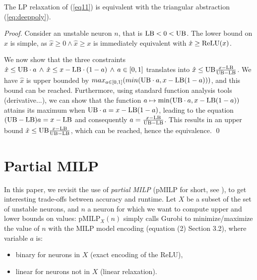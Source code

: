 



\begin{proposition}
	\cite{alessandro}
	\label{LP}
	The LP relaxation of (\ref{eq11}) is equivalent with the triangular abstraction 	(\ref{eq:deeppoly}).
\end{proposition}
 




\begin{proof}
	Consider an unstable neuron $n$, that is $\mathrm{LB} < 0 < \mathrm{UB}$.
The lower bound on $\hat{x}$ is simple, as $\hat{x} \geq 0 \wedge \hat{x} \geq x$ is immediately equivalent with $\hat{x} \geq \mathrm{ReLU}(x)$.

We now show that the three constraints 
$\hat{x} \leq \mathrm{UB} \cdot a \, \wedge \, \hat{x} \leq x-\mathrm{LB} \cdot (1-a) \, \wedge \, a \in [0,1]$ translates into $\hat{x} \leq \mathrm{UB} \frac{x-\mathrm{LB}}{\mathrm{UB}-\mathrm{LB}}$. 
We have $\hat{x}$ is upper bounded by $max_{a \in [0,1]} (min(\mathrm{UB} \cdot a, x - \mathrm{LB} (1-a)))$, and this bound can be reached. Furthermore, using standard function analysis tools (derivative...), we can show that the function $a \mapsto \min(\mathrm{UB} \cdot a, x - \mathrm{LB} (1-a))$ attains its maximum when $\mathrm{UB} \cdot a = x - \mathrm{LB} (1-a)$, leading to the equation $(\mathrm{UB} - \mathrm{LB}) a = x - \mathrm{LB}$ and consequently $a = \frac{x - \mathrm{LB}}{\mathrm{UB}-\mathrm{LB}}$. This results in an upper bound $\hat{x} \leq \mathrm{UB} \frac{x - \mathrm{LB}}{\mathrm{UB}-\mathrm{LB}}$, which can be reached, hence the equivalence.
\qed
\end{proof}













\section{Partial MILP}	


In this paper, we revisit the use of {\em partial MILP} (pMILP for short, see \cite{DivideAndSlide}), to get interesting trade-offs between accuracy and runtime.
Let $X$ be a subset of the set of unstable neurons, and $n$ a neuron for which we want to compute upper and lower bounds on values: pMILP$_X(n)$ simply calls Gurobi to minimize/maximize the value of $n$ with the MILP model encoding (equation (2) Section 3.2), where variable $a$ is:
\begin{itemize}
\item binary for neurons in $X$ (exact encoding of the ReLU),
\item linear for neurons not in $X$ (linear relaxation).
\end{itemize}


